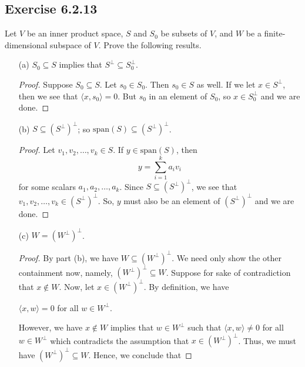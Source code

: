 \subsection*{Exercise 6.2.13} Let \( V  \) be an inner product space, \( S  \) and \( {S}_{0} \) be subsets of \( V  \), and \( W  \) be a finite-dimensional subspace of \( V  \). Prove the following results.
\begin{enumerate}
    \item[(a)] \( {S}_{0} \subseteq S  \) implies that \( S^{\perp} \subseteq {S}_{0}^{\perp} \).
        \begin{proof}
            Suppose \( {S}_{0} \subseteq S \). Let \( {s}_{0} \in {S}_{0} \). Then \( {s}_{0} \in S  \) as well. If we let \( x \in S^{\perp} \), then  we see that \( \langle x ,  {s}_0  \rangle = 0  \). But \( {s}_{0} \) in an element of \( {S}_{0} \), so \( x \in {S}_{0}^{\perp} \) and we are done.  
        \end{proof}
    \item[(b)] \( S \subseteq (S^{\perp})^{\perp} \); so \( \text{span}(S) \subseteq (S^{\perp})^{\perp} \).
        \begin{proof}
        Let \( {v}_{1}, {v}_{2}, \dots, {v}_{k} \in S  \). If \( y \in \text{span}(S) \), then 
        \[  y = \sum_{ i=1  }^{  k  } {a}_{i} {v}_{i}  \]
        for some scalars \( {a}_{1}, {a}_{2}, \dots, {a}_{k }  \). Since \( S \subseteq (S^\perp)^{\perp} \), we see that \( {v}_{1}, {v}_{2}, \dots, {v}_{k} \in (S^{\perp})^{\perp} \). So, \( y  \) must also be an element of \( (S^{\perp})^{\perp} \) and we are done.
        \end{proof}
    \item[(c)] \( W = (W^{\perp})^{\perp} \).
        \begin{proof}
        By part (b), we have \( W \subseteq (W^{\perp})^{\perp} \). We need only show the other containment now, namely, \( (W^{\perp})^{\perp} \subseteq W  \). Suppose for sake of contradiction that \( x \notin W  \). Now, let \( x \in (W^{\perp})^{\perp} \). By definition, we have   
        \begin{center}
            \( \langle x , w \rangle = 0   \) for all \( w \in W^{\perp} \).
        \end{center}
        However, we have \( x \notin W  \) implies that \( w \in W^{\perp} \) such that \( \langle x , w \rangle \neq 0  \) for all \( w \in W^{\perp} \) which contradicts the assumption that \( x \in (W^{\perp})^{\perp}  \). Thus, we must have \( (W^{\perp})^{\perp} \subseteq W  \). Hence, we conclude that 

\end{proof}
\end{enumerate}
